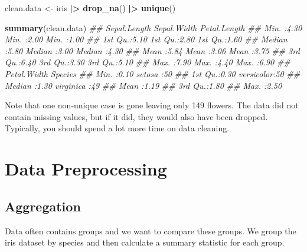 \documentclass[
  notitlepage]{book}
\newenvironment{Shaded}{\begin{snugshade}}{\end{snugshade}}
\newcommand{\CommentTok}[1]{\textcolor[rgb]{0.56,0.35,0.01}{\textit{#1}}}
\newcommand{\ErrorTok}[1]{\textcolor[rgb]{0.64,0.00,0.00}{\textbf{#1}}}
\newcommand{\KeywordTok}[1]{\textcolor[rgb]{0.13,0.29,0.53}{\textbf{#1}}}
\newcommand{\NormalTok}[1]{#1}
\newcommand{\OperatorTok}[1]{\textcolor[rgb]{0.81,0.36,0.00}{\textbf{#1}}}
\newcommand{\StringTok}[1]{\textcolor[rgb]{0.31,0.60,0.02}{#1}}
\begin{document}
\begin{Shaded}
\begin{Highlighting}[]
\NormalTok{clean.data \textless{}{-}}\StringTok{ }\NormalTok{iris }\OperatorTok{|}\ErrorTok{\textgreater{}}\StringTok{ }
\StringTok{  }\KeywordTok{drop\_na}\NormalTok{() }\OperatorTok{|}\ErrorTok{\textgreater{}}\StringTok{ }
\StringTok{  }\KeywordTok{unique}\NormalTok{()}

\KeywordTok{summary}\NormalTok{(clean.data)}
\CommentTok{\#\#   Sepal.Length   Sepal.Width    Petal.Length }
\CommentTok{\#\#  Min.   :4.30   Min.   :2.00   Min.   :1.00  }
\CommentTok{\#\#  1st Qu.:5.10   1st Qu.:2.80   1st Qu.:1.60  }
\CommentTok{\#\#  Median :5.80   Median :3.00   Median :4.30  }
\CommentTok{\#\#  Mean   :5.84   Mean   :3.06   Mean   :3.75  }
\CommentTok{\#\#  3rd Qu.:6.40   3rd Qu.:3.30   3rd Qu.:5.10  }
\CommentTok{\#\#  Max.   :7.90   Max.   :4.40   Max.   :6.90  }
\CommentTok{\#\#   Petal.Width         Species  }
\CommentTok{\#\#  Min.   :0.10   setosa    :50  }
\CommentTok{\#\#  1st Qu.:0.30   versicolor:50  }
\CommentTok{\#\#  Median :1.30   virginica :49  }
\CommentTok{\#\#  Mean   :1.19                  }
\CommentTok{\#\#  3rd Qu.:1.80                  }
\CommentTok{\#\#  Max.   :2.50}
\end{Highlighting}
\end{Shaded}

Note that one non-unique case is gone leaving only 149 flowers. The data
did not contain missing values, but if it did, they would also have been
dropped. Typically, you should spend a lot more time on data cleaning.

\hypertarget{data-preprocessing}{%
\section{Data Preprocessing}\label{data-preprocessing}}

\hypertarget{aggregation}{%
\subsection{Aggregation}\label{aggregation}}

Data often contains groups and we want to compare these groups. We group
the iris dataset by species and then calculate a summary statistic for
each group.
\end{document}
